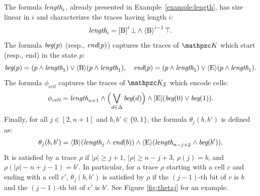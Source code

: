 The formula  $\textit{length}_i$, already presented in Example~\ref{example:length}, has size linear in $i$ and characterizes the traces having length $i$: %
\[
\textit{length}_i= \operatorname{\mathopen[ B \mathclose]}^{i} \bot \wedge \operatorname{\langle B\rangle}^{i-1} \top.
\]
The formula $\textit{beg}(p)$ (resp., $\textit{end}(p)$) captures the traces of $\Ku$ which start (resp., end) in the state $p$:
\[
\textit{beg}(p)= (p\wedge \textit{length}_1) \vee \operatorname{\langle B\rangle}(p\wedge \textit{length}_1),
\quad
\textit{end}(p)= (p\wedge \textit{length}_1) \vee \operatorname{\langle E\rangle}(p\wedge \textit{length}_1).
\]
The formula $\phi_{\textit{cell}}$ captures the traces of $\Ku_\Instance$ which encode cells:
\[
\phi_{\textit{cell}}= \textit{length}_{n+1}\wedge \Big(\displaystyle{\bigvee_{d\in \Delta} \textit{beg}(d)}\Big)\wedge \operatorname{\mathopen[ E \mathclose]}(\textit{beg}(0)\vee \textit{beg}(1)).
\]
%
Finally, for all $j\in [2,n+1]$ and $b,b'\in \{0,1\}$, the formula $\theta_j(b,b')$ is defined as:
\[
\theta_j(b,b')= \operatorname{\langle B\rangle}(\textit{length}_j \wedge \textit{end}(b))\wedge \operatorname{\langle E\rangle}(\textit{length}_{n-j+2} \wedge \textit{beg}(b')).
\]
It is satisfied by a trace $\rho$ if $|\rho|\geq j+1$, $|\rho|\geq n-j+3$, $\rho(j)= b$, and $\rho(|\rho|-n+j-1)=b'$. In particular, for a trace $\rho$ starting with a cell $c$ and ending with a cell $c'$, $\theta_j(b,b')$ is satisfied by $\rho$ if the $(j-1)$-th bit of $c$ is $b$ and the $(j-1)$-th bit of $c'$ is $b'$. See Figure \ref{fig:thetaj} for an example.
